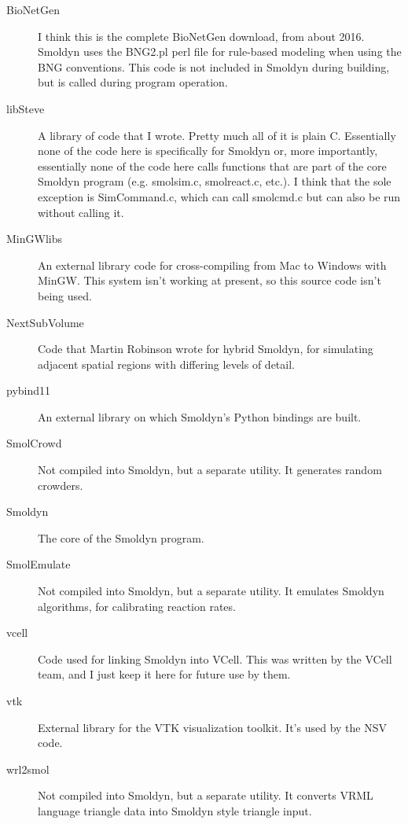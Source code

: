 \documentclass {book}
\begin{document}
\begin{description}

\item[BioNetGen] I think this is the complete BioNetGen download, from about 2016. Smoldyn uses the BNG2.pl perl file for rule-based modeling when using the BNG conventions. This code is not included in Smoldyn during building, but is called during program operation.

\item[libSteve] A library of code that I wrote. Pretty much all of it is plain C. Essentially none of the code here is specifically for Smoldyn or, more importantly, essentially none of the code here calls functions that are part of the core Smoldyn program (e.g. smolsim.c, smolreact.c, etc.). I think that the sole exception is SimCommand.c, which can call smolcmd.c but can also be run without calling it.

\item[MinGWlibs] An external library code for cross-compiling from Mac to Windows with MinGW. This system isn't working at present, so this source code isn't being used.

\item[NextSubVolume] Code that Martin Robinson wrote for hybrid Smoldyn, for simulating adjacent spatial regions with differing levels of detail.

\item[pybind11] An external library on which Smoldyn's Python bindings are built.

\item[SmolCrowd] Not compiled into Smoldyn, but a separate utility. It generates random crowders.

\item[Smoldyn] The core of the Smoldyn program.

\item[SmolEmulate] Not compiled into Smoldyn, but a separate utility. It emulates Smoldyn algorithms, for calibrating reaction rates.

\item[vcell] Code used for linking Smoldyn into VCell. This was written by the VCell team, and I just keep it here for future use by them.

\item[vtk] External library for the VTK visualization toolkit. It's used by the NSV code.

\item[wrl2smol] Not compiled into Smoldyn, but a separate utility. It converts VRML language triangle data into Smoldyn style triangle input.

\end{description}
\end{document}
